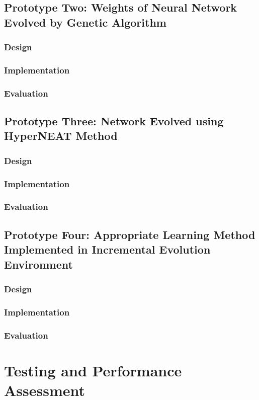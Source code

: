 \documentclass[11pt,a4paper]{article}
\begin{document}
\newpage
\subsection{Prototype Two: Weights of Neural Network Evolved by Genetic Algorithm}
\subsubsection{Design}
\subsubsection{Implementation}
\subsubsection{Evaluation}
\subsection{Prototype Three: Network Evolved using HyperNEAT Method}
\subsubsection{Design}
\subsubsection{Implementation}
\subsubsection{Evaluation}
\subsection{Prototype Four: Appropriate Learning Method Implemented in Incremental Evolution Environment}
\subsubsection{Design}
\subsubsection{Implementation}
\subsubsection{Evaluation}
\newpage
\section{Testing and Performance Assessment}
\end{document}
